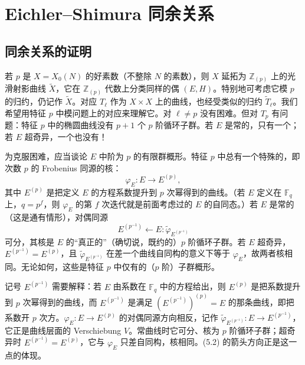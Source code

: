 \section{Eichler--Shimura 同余关系}\label{c5:sec:5}

\subsection{同余关系的证明}\label{c5:sec:5.1}

若 $p$ 是 $X=X_0(N)$ 的好素数（不整除 $N$ 的素数），则 $X$ 延拓为 $\mathbb{Z}_{(p)}$ 上的光滑射影曲线 $\tilde{X}$，它在 $\mathbb{Z}_{(p)}$ 代数上分类同样的偶 $(E,H)$。特别地可考虑它模 $p$ 的归约，仍记作 $\tilde{X}$。对应 $T_\ell$ 作为 $X\times X$ 上的曲线，也经受类似的归约 $\tilde{T}_\ell$。我们希望用特征 $p$ 中模问题上的对应来理解它。对 $\ell\neq p$ 没有困难。但对 $T_p$ 有问题：特征 $p$ 中的椭圆曲线没有 $p+1$ 个 $p$ 阶循环子群。若 $E$ 是常的，只有一个；若 $E$ 超奇异，一个也没有！

为克服困难，应当谈论 $E$ 中阶为 $p$ 的有限群概形。特征 $p$ 中总有一个特殊的，即次数 $p$ 的 Frobenius 同源的核：
\begin{equation}\tag{5.1}\label{c5:eq:5.1}
\varphi_E\colon E\longrightarrow E^{(p)},
\end{equation}
其中 $E^{(p)}$ 是把定义 $E$ 的方程系数提升到 $p$ 次幂得到的曲线。（若 $E$ 定义在 $\mathbb{F}_q$ 上，$q=p^f$，则 $\varphi_E$ 的第 $f$ 次迭代就是前面考虑过的 $E$ 的自同态。）若 $E$ 是常的（这是通有情形），对偶同源
\begin{equation}\tag{5.2}\label{c5:eq:5.2}
E^{(p^{-1})}\longleftarrow E:\tilde{\varphi}_{E^{(p^{-1})}}
\end{equation}
可分，其核是 $E$ 的“真正的”（确切说，既约的）$p$ 阶循环子群。若 $E$ 超奇异，$E^{(p^{-1})}=E^{(p)}$，且 $\tilde{\varphi}_{E^{(p^{-1})}}$ 在差一个曲线自同构的意义下等于 $\varphi_E$，故两者核相同。无论如何，这些是特征 $p$ 中仅有的（$p$ 阶）子群概形。

\begin{annote}
记号 $E^{(p^{-1})}$ 需要解释：若 $E$ 由系数在 $\mathbb{F}_q$ 中的方程给出，则 $E^{(p)}$ 是把系数提升到 $p$ 次幂得到的曲线，而 $E^{(p^{-1})}$ 是满足 $(E^{(p^{-1})})^{(p)}=E$ 的那条曲线，即把系数开 $p$ 次方。$\varphi_E\colon E\to E^{(p)}$ 的对偶同源方向相反，记作 $\tilde{\varphi}_{E^{(p^{-1})}}\colon E\to E^{(p^{-1})}$，它正是曲线层面的 Verschiebung $V$。常曲线时它可分、核为 $p$ 阶循环子群；超奇异时 $E^{(p^{-1})}=E^{(p)}$，它与 $\varphi_E$ 只差自同构，核相同。(5.2) 的箭头方向正是这一点的体现。
\par\vspace{0.15em}{\raggedleft 【来源：Silverman《The Arithmetic of Elliptic Curves》第 V 章（A）；Mumford《Abelian Varieties》第 12 节（A）】\par}
\end{annote}

